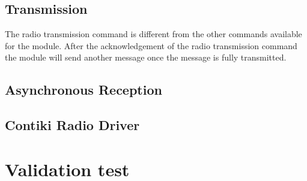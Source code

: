 

\subsection{Transmission}

The radio transmission command is different from the other commands available
for the module. After the acknowledgement of the radio transmission command the
module will send another message once the message is fully transmitted.



\subsection{Asynchronous Reception}



\subsection{Contiki Radio Driver}

\section{Validation test}

